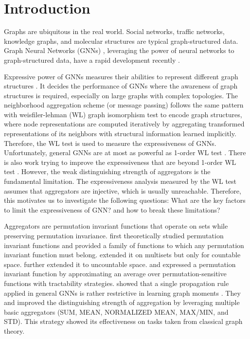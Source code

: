 \documentclass{article} \usepackage{iclr2021_conference,times}
\begin{document}
\section{Introduction}

Graphs are ubiquitous in the real world.
Social networks, traffic networks, knowledge graphs, and molecular structures are typical graph-structured data.
Graph Neural Networks (GNNs) \citep{scarselli2008graph,gori2005new}, leveraging the power of neural networks to graph-structured data, have a rapid development recently \citep{kipf2016semi,hamilton2017inductive,bronstein2017geometric,gilmer2017neural,duvenaud2015convolutional}.

Expressive power of GNNs measures their abilities to represent different graph structures \citep{sato2020survey}.
It decides the performance of GNNs where the awareness of graph structures is required,
especially on large graphs with complex topologies.
The neighborhood aggregation scheme (or message passing) follows the same pattern with weisfiler-lehman (WL) graph isomorphism test \citep{Weisfeiler1968ReductionOA} to encode graph structures,
where node representations are computed iteratively by aggregating transformed representations of its neighbors with structural information learned implicitly.
Therefore, the WL test is used to measure the expressiveness of GNNs.
Unfortunately, general GNNs are at most as powerful as 1-order WL test \citep{morris2019weisfeiler,xu2018how}.
There is also work trying to improve the expressiveness that are beyond 1-order WL test \citep{maron2019provably,morris2019weisfeiler,chen2019equivalence,li2020distance,vignac2020building}.
However, the weak distinguishing strength of aggregators is the fundamental limitation.
The expressiveness analysis measured by the WL test assumes that aggregators are injective, which is usually unreachable.
Therefore,
this motivates us to investigate the following questions:
What are the key factors to limit the expressiveness of GNN?
and how to break these limitations?

Aggregators are permutation invariant functions that operate on sets while preserving permutation invariance.
\citep{zaheer2017deep} first theoretically studied permutation invariant functions and provided a family of functions to which any permutation invariant function must belong.
\citep{xu2018how} extended it on multisets but only for countable space.
\citep{corso2020principal} further extended it to uncountable space.
\citep{murphy2018janossy} and \citep{murphy2019relational} expressed a permutation invariant function by approximating an average over permutation-sensitive functions with tractability strategies.
\citep{dehmamy2019understanding} showed that a single propagation rule applied in general GNNs is rather restrictive in learning graph moments \citep{lin1995algorithms}.
They and \citep{corso2020principal} improved the distinguishing strength of aggregation by leveraging multiple basic aggregators (SUM, MEAN, NORMALIZED MEAN, MAX/MIN, and STD).
This strategy showed its effectiveness on tasks taken from classical graph theory.
\end{document}
